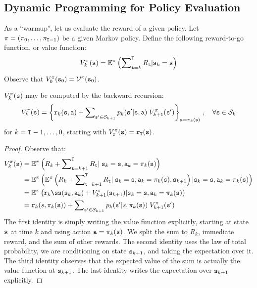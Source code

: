 \subsection{Dynamic Programming for Policy Evaluation}\label{sss:pol_eval}
As a ``warmup", let us evaluate the reward of a given policy. Let
$\pi  = ({\pi _0}, \ldots ,{\pi _{{\tt T} -1}})$ be a
given Markov policy. Define the following reward-to-go function, or
value function:
\[V_k^\pi ({\tt s}) = {\mathbb{E}^\pi }\left( {\sum\nolimits_{{\tt t} = k}^{\tt T} {{R_{\tt t}}|{{\tt s}_k} = {\tt s}} } \right)\]
Observe that $V_0^\pi ({{\tt s}_0}) = {\mathcal{V}^\pi }({{\tt s}_0})$.

\begin{lemma}\label{lem:finite_horizon_VI} $V_k^\pi ({\tt s})$ may be computed by the backward recursion:
\[V_k^\pi ({\tt s}) = {\left\{ {{{\tt r}_k}({\tt s},{\tt a}) + \sum\nolimits_{{\tt s}' \in {\mathcal{S}_{k + 1}}} {{p_k}({\tt s}'|{\tt s},{\tt a})} \;V_{k + 1}^\pi ({\tt s}')} \right\}_{a = {\pi _k}({\tt s})}}\;,\quad \forall {\tt s} \in {\mathcal{S}_k}\]
for $k = {\tt T} -1, \ldots ,0$,  starting with
$V_{\tt T}^\pi ({\tt s}) = {{\tt r}_{\tt T}}({\tt s})$.
\end{lemma}
\begin{proof}
Observe that:
\begin{align*}
V_k^\policy (\state) &= {\E^\policy }\left( {{R_k} + \sum\nolimits_{\ttime = k + 1}^\tHorizon {{R_\ttime}|} \;{\state_k} = \state,{\action_k} = {\policy _k}(\state)} \right)\\
 &= {\E^\policy }\left( {{\E^\policy }\left( {{R_k} + \sum\nolimits_{\ttime = k + 1}^\tHorizon {{R_\ttime}} |\;{\state_k} = \state,{\action_k} = {\policy _k}(\state),{\state_{k + 1}}} \right)|{\state_k} = \state,{\action_k} = {\policy _k}(\state)} \right)\\
 &= {\E^\policy }\left( {\reward_kß({\state_k},{\action_k}) + V_{k + 1}^\policy ({\state_{k + 1}})|{\state_k} = \state,{\action_k} = {\policy _k}(\state)} \right)\\
 &= {\reward_k}(s,{\policy _k}(\state)) + \sum\nolimits_{\state' \in {\States_{k + 1}}} {{p_k}(\state'|s,{\policy _k}(\state))} \;V_{k + 1}^\policy (\state')
\end{align*}
The first identity is simply writing the value function explicitly,
starting at state ${\tt s}$ at time $k$ and using action
${\tt a}=\pi_k({\tt s})$.  We split the sum to $R_k$, immediate
reward, and the sum of other rewards.
The second identity uses the law of total probability, we are
conditioning on state ${\tt s}_{k+1}$, and taking the expectation
over it.
%
The third identity observes that the expected value of the sum is actually the value function at ${\tt s}_{k+1}$. The last identity writes the expectation over ${\tt s}_{k+1}$ explicitly.
\end{proof}

